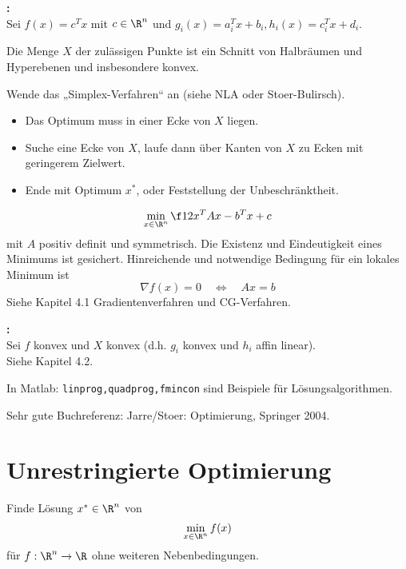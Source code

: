 \documentclass[11pt]{scrbook}
\begin{document}
\begin{seg}
	\begin{description}
		\item[Lineares Optimierungsproblem, „\emph{lineare Programme}“ (LP)]\textbf{:} \\  
			Sei $f(x) = c^Tx$ mit $c\in \R^n$ und  $g_i(x) = a_i^Tx + b_i, h_i(x) = c_i^Tx + d_i$.

			Die Menge $X$ der zulässigen Punkte ist ein Schnitt von Halbräumen und Hyperebenen und insbesondere konvex.
			
			Wende das „Simplex-Verfahren“ an (siehe NLA oder Stoer-Bulirsch).
			\begin{itemize}
				\item
					Das Optimum muss in einer Ecke von $X$ liegen.
				\item
					Suche eine Ecke von $X$, laufe dann über Kanten von $X$ zu Ecken mit geringerem Zielwert.
				\item
					Ende mit Optimum $x^*$, oder Feststellung der Unbeschränktheit.
			\end{itemize}
		\item[Unrestringierte Quadratische Optimierung, „\emph{Quadratische Programme}“]
			\[
				\min_{x\in\R^n} \f 12 x^TAx - b^Tx + c 
			\]
			mit $A$ positiv definit und symmetrisch.
			Die Existenz und Eindeutigkeit eines Minimums ist gesichert.
			Hinreichende und notwendige Bedingung für ein lokales Minimum ist
			\[
				\nabla f(x) = 0 \quad \iff \quad Ax = b
			\]
			Siehe Kapitel 4.1 Gradientenverfahren und CG-Verfahren.
		\item[Konvexe Optimierung]\textbf{:} \\
			Sei $f$ konvex und $X$ konvex (d.h. $g_i$ konvex und $h_i$ affin linear). \\
			Siehe Kapitel 4.2.
		\item
			In Matlab: \texttt{linprog,quadprog,fmincon} sind Beispiele für Lösungsalgorithmen.
		\item
			Sehr gute Buchreferenz: Jarre/Stoer: Optimierung, Springer 2004.
	\end{description}
\end{seg}

\section{Unrestringierte Optimierung}

\begin{seg}[Problem]
	Finde Lösung $x^*\in \R^n$ von
	\[
		\min_{x\in\R^n}f(x)
	\]
	für $f: \R^n \to \R$ ohne weiteren Nebenbedingungen.
\end{seg}
\end{document}
